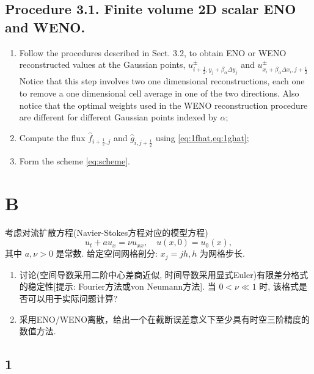 \documentclass[12pt]{article}
\begin{document}
\subsection{Procedure 3.1. Finite volume 2D scalar ENO and WENO.}


\begin{enumerate}
	\item Follow the procedures described in Sect. 3.2, to obtain ENO or WENO reconstructed values at the Gaussian points, $u_{i+\frac{1}{2}, y_{j}+\beta_{\alpha} \Delta y_{j}}^{\pm}$ and $u_{x_{i}+\beta_{\alpha} \Delta x_{i}, j+\frac{1}{2}}^{\pm}$ Notice that this step involves two one dimensional reconstructions, each one to remove a one dimensional cell average in one of the two directions. Also notice that the optimal weights used in the WENO reconstruction procedure are different for different Gaussian points indexed by $\alpha$;
	\item Compute the flux $\hat{f}_{i+\frac{1}{2}, j}$ and $\hat{g}_{i, j+\frac{1}{2}}$ using \cref{eq:1fhat,eq:1ghat};
	\item Form the scheme \cref{eq:scheme}.
\end{enumerate}




\section{B}

考虑对流扩散方程(Navier-Stokes方程对应的模型方程)
\begin{equation}
	u_{t}+a u_{x}=\nu u_{x x}, \quad u(x, 0)=u_{0}(x),
	\label{eq:21}
\end{equation}
其中 $a, \nu>0$ 是常数. 给定空间网格剖分: $x_{j}=j h, h$ 为网格步长.
\begin{enumerate}
	\item 讨论(空间导数采用二阶中心差商近似, 时间导数采用显式Euler)有限差分格式的稳定性[提示: Fourier方法或von Neumann方法]. 当 $0<\nu \ll 1$ 时, 该格式是否可以用于实际问题计算?
	\item 采用ENO/WENO离散，给出一个在截断误差意义下至少具有时空三阶精度的数值方法.
\end{enumerate}

\subsection{1}
\end{document}

